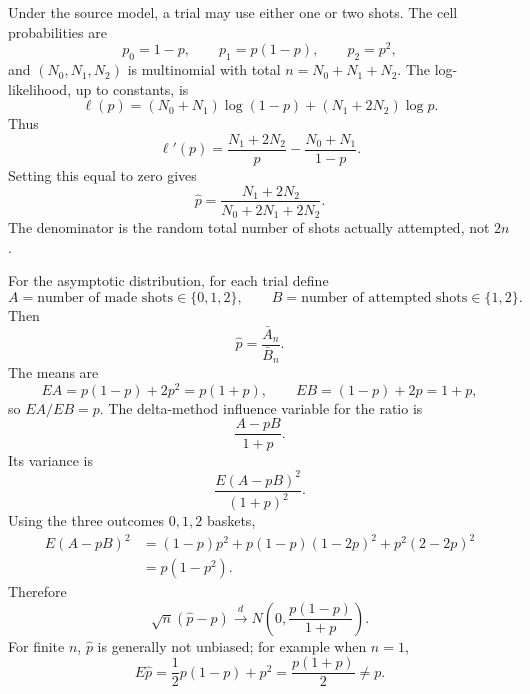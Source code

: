 \begin{solution}
Under the source model, a trial may use either one or two shots. The cell probabilities are
\[
p_0=1-p,\qquad p_1=p(1-p),\qquad p_2=p^2,
\]
and $(N_0,N_1,N_2)$ is multinomial with total $n=N_0+N_1+N_2$.  The log-likelihood, up to constants, is
\[
\ell(p)=(N_0+N_1)\log(1-p)+(N_1+2N_2)\log p.
\]
Thus
\[
\ell'(p)=\frac{N_1+2N_2}{p}-\frac{N_0+N_1}{1-p}.
\]
Setting this equal to zero gives
\[
\widehat p
=\frac{N_1+2N_2}{N_0+2N_1+2N_2}.
\]
The denominator is the random total number of shots actually attempted, not $2n$.

For the asymptotic distribution, for each trial define
\[
A=\text{number of made shots}\in\{0,1,2\},
\qquad
B=\text{number of attempted shots}\in\{1,2\}.
\]
Then
\[
\widehat p=\frac{\bar A_n}{\bar B_n}.
\]
The means are
\[
E A=p(1-p)+2p^2=p(1+p),
\qquad
E B=(1-p)+2p=1+p,
\]
so $EA/EB=p$. The delta-method influence variable for the ratio is
\[
\frac{A-pB}{1+p}.
\]
Its variance is
\[
\frac{E(A-pB)^2}{(1+p)^2}.
\]
Using the three outcomes $0,1,2$ baskets,
\[
\begin{aligned}
E(A-pB)^2
&=(1-p)p^2+p(1-p)(1-2p)^2+p^2(2-2p)^2\\
&=p(1-p^2).
\end{aligned}
\]
Therefore
\[
\sqrt n(\widehat p-p)
\xrightarrow{d}
N\left(0,\frac{p(1-p)}{1+p}\right).
\]
For finite $n$, $\widehat p$ is generally not unbiased; for example when $n=1$,
\[
E\widehat p=\frac{1}{2}p(1-p)+p^2=\frac{p(1+p)}{2}\neq p.
\]
\end{solution}

